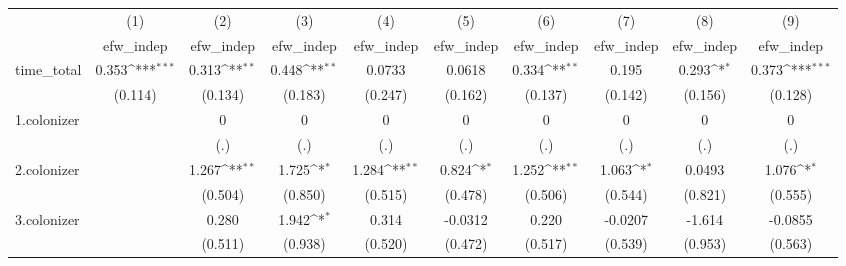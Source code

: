 {
\def\sym#1{\ifmmode^{#1}\else\(^{#1}\)\fi}
\begin{tabular}{l*{9}{c}}
\hline\hline
            &\multicolumn{1}{c}{(1)}&\multicolumn{1}{c}{(2)}&\multicolumn{1}{c}{(3)}&\multicolumn{1}{c}{(4)}&\multicolumn{1}{c}{(5)}&\multicolumn{1}{c}{(6)}&\multicolumn{1}{c}{(7)}&\multicolumn{1}{c}{(8)}&\multicolumn{1}{c}{(9)}\\
            &\multicolumn{1}{c}{efw\_indep}&\multicolumn{1}{c}{efw\_indep}&\multicolumn{1}{c}{efw\_indep}&\multicolumn{1}{c}{efw\_indep}&\multicolumn{1}{c}{efw\_indep}&\multicolumn{1}{c}{efw\_indep}&\multicolumn{1}{c}{efw\_indep}&\multicolumn{1}{c}{efw\_indep}&\multicolumn{1}{c}{efw\_indep}\\
\hline
time\_total  &       0.353\sym{***}&       0.313\sym{**} &       0.448\sym{**} &      0.0733         &      0.0618         &       0.334\sym{**} &       0.195         &       0.293\sym{*}  &       0.373\sym{***}\\
            &     (0.114)         &     (0.134)         &     (0.183)         &     (0.247)         &     (0.162)         &     (0.137)         &     (0.142)         &     (0.156)         &     (0.128)         \\
[1em]
1.colonizer &                     &           0         &           0         &           0         &           0         &           0         &           0         &           0         &           0         \\
            &                     &         (.)         &         (.)         &         (.)         &         (.)         &         (.)         &         (.)         &         (.)         &         (.)         \\
[1em]
2.colonizer &                     &       1.267\sym{**} &       1.725\sym{*}  &       1.284\sym{**} &       0.824\sym{*}  &       1.252\sym{**} &       1.063\sym{*}  &      0.0493         &       1.076\sym{*}  \\
            &                     &     (0.504)         &     (0.850)         &     (0.515)         &     (0.478)         &     (0.506)         &     (0.544)         &     (0.821)         &     (0.555)         \\
[1em]
3.colonizer &                     &       0.280         &       1.942\sym{*}  &       0.314         &     -0.0312         &       0.220         &     -0.0207         &      -1.614         &     -0.0855         \\
            &                     &     (0.511)         &     (0.938)         &     (0.520)         &     (0.472)         &     (0.517)         &     (0.539)         &     (0.953)         &     (0.563)         \\

\end{tabular}}
